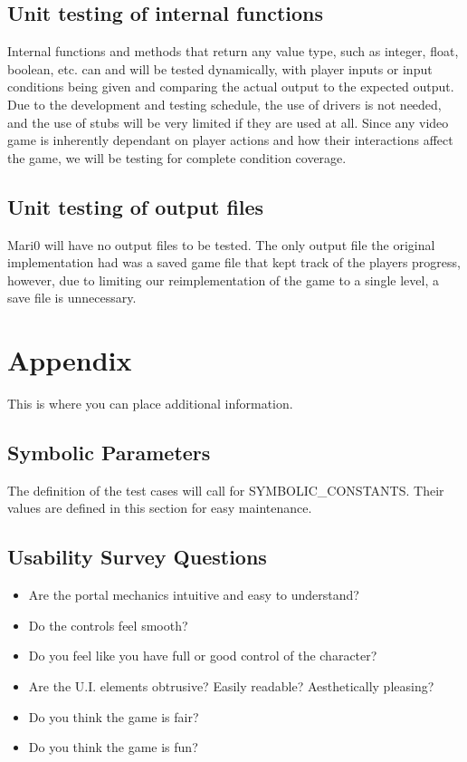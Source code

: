 \documentclass[12pt, titlepage]{article}
\begin{document}
\subsection{Unit testing of internal functions}
	Internal functions and methods that return any value type, such as integer, float, boolean, etc. can and will be tested dynamically, with player inputs or input conditions being given and comparing the actual output to the expected output. Due to the development and testing schedule, the use of drivers is not needed, and the use of stubs will be very limited if they are used at all. Since any video game is inherently dependant on player actions and how their interactions affect the game, we will be testing for complete condition coverage.
\subsection{Unit testing of output files}		
	Mari0 will have no output files to be tested. The only output file the original implementation had was a saved game file that kept track of the players progress, however, due to limiting our reimplementation of the game to a single level, a save file is unnecessary.




\newpage

\section{Appendix}

This is where you can place additional information.

\subsection{Symbolic Parameters}

The definition of the test cases will call for SYMBOLIC\_CONSTANTS.
Their values are defined in this section for easy maintenance.

\subsection{Usability Survey Questions}

\begin{itemize}
Since many functionalities of Mari0 are difficult to test, either due to testing having to be done manually or a bias by the development team during testing, the following usability suvey questions have been listed to test some of these difficult functionalities
  \item Are the portal mechanics intuitive and easy to understand?
  \item Do the controls feel smooth?
  \item Do you feel like you have full or good control of the character?
  \item Are the U.I. elements obtrusive? Easily readable? Aesthetically pleasing?
  \item Do you think the game is fair?
  \item Do you think the game is fun?
\end{itemize}
\end{document}
